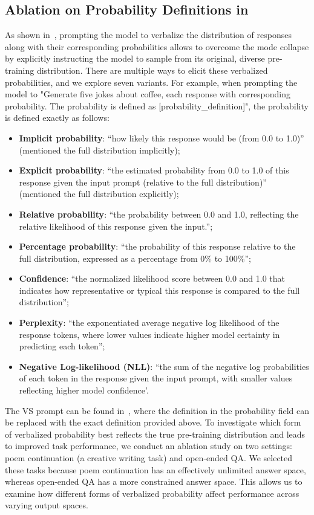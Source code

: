 \subsection{Ablation on Probability Definitions in \ours}\label{sec:ablation_probability_format}
As shown in~, prompting the model to verbalize the distribution of responses along with their corresponding probabilities allows \ours to overcome the mode collapse by explicitly instructing the model to sample from its original, diverse pre-training distribution. There are multiple ways to elicit these verbalized probabilities, and we explore seven variants. For example, when prompting the model to "Generate five jokes about coffee, each response with corresponding probability. The probability is defined as [probability\_definition]", the probability is defined exactly as follows:
\begin{itemize}
    \item \textbf{Implicit probability}: ``how likely this response would be (from 0.0 to 1.0)'' (mentioned the full distribution implicitly); 
    \item \textbf{Explicit probability}: ``the estimated probability from 0.0 to 1.0 of this response given the input prompt (relative to the full distribution)'' (mentioned the full distribution explicitly);
    \item \textbf{Relative probability}: ``the probability between 0.0 and 1.0, reflecting the relative likelihood of this response given the input.''; 
    \item \textbf{Percentage probability}: ``the probability of this response relative to the full distribution, expressed as a percentage from 0\% to 100\%'';
    \item \textbf{Confidence}: ``the normalized likelihood score between 0.0 and 1.0 that indicates how representative or typical this response is compared to the full distribution''; 
    \item \textbf{Perplexity}: ``the exponentiated average negative log likelihood of the response tokens, where lower values indicate higher model certainty in predicting each token''; 
    \item \textbf{Negative Log-likelihood (NLL)}: ``the sum of the negative log probabilities of each token in the response given the input prompt, with smaller values reflecting higher model confidence'.
\end{itemize}

The VS prompt can be found in~, where the definition in the probability field can be replaced with the exact definition provided above. To investigate which form of verbalized probability best reflects the true pre-training distribution and leads to improved task performance, we conduct an ablation study on two settings: poem continuation (a creative writing task) and open-ended QA. We selected these tasks because poem continuation has an effectively unlimited answer space, whereas open-ended QA has a more constrained answer space. This allows us to examine how different forms of verbalized probability affect performance across varying output spaces.

